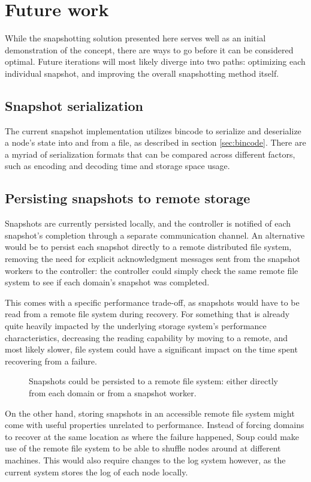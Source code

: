 \documentclass[b5paper]{report}
\begin{document}
\section{Future work}
While the snapshotting solution presented here serves well as an
initial demonstration of the concept, there are ways to go before it can be
considered optimal. Future iterations will most likely diverge into two paths:
optimizing each individual snapshot, and improving the overall snapshotting
method itself.

\subsection{Snapshot serialization}
The current snapshot implementation utilizes bincode \cite{bincode} to serialize
and deserialize a node's state into and from a file, as described in section
\ref{sec:bincode}. There are a myriad of serialization formats that can be
compared across different factors, such as encoding and decoding time and
storage space usage.

\subsection{Persisting snapshots to remote storage}
Snapshots are currently persisted locally, and the controller is notified of
each snapshot's completion through a separate communication channel. An
alternative would be to persist each snapshot directly to a remote distributed
file system, removing the need for explicit acknowledgment messages sent from
the snapshot workers to the controller: the controller could simply check the
same remote file system to see if each domain's snapshot was completed.

This comes with a specific performance trade-off, as snapshots would have to be
read from a remote file system during recovery. For something that is already
quite heavily impacted by the underlying storage system's performance
characteristics, decreasing the reading capability by moving to a remote, and
most likely slower, file system could have a significant impact on the time
spent recovering from a failure.

\begin{figure}[H]
  
  \caption{
    Snapshots could be persisted to a remote file system: either directly from
    each domain or from a snapshot worker.
  }
\end{figure}

On the other hand, storing snapshots in an accessible remote file system might
come with useful properties unrelated to performance. Instead of forcing domains
to recover at the same location as where the failure happened, Soup could make
use of the remote file system to be able to shuffle nodes around at different
machines. This would also require changes to the log system however, as the
current system stores the log of each node locally.
\end{document}
